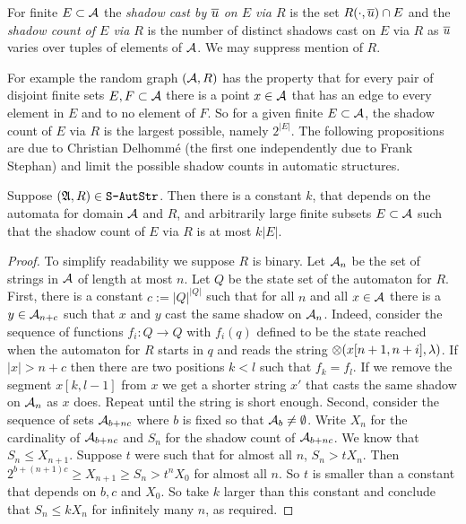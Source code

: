 \begin{definition}
For finite $E \subset {\mathcal A}$ the  {\em shadow cast by $\mbox{$\overline {u}$}$ on $E$ via $R$} is the set 
$R(\cdot,\mbox{$\overline {u}$}) \cap E$ and the {\em shadow count of $E$ via $R$} is the number of distinct shadows
cast on $E$ via $R$ as $\mbox{$\overline {u}$}$ varies over tuples of elements of ${\mathcal A}$. We may suppress mention of $R$.
\end{definition}

For example the random graph $({\mathcal A},R)$ has the property that for every pair of disjoint finite sets $E,F \subset {\mathcal A}$ there is a point $x \in {\mathcal A}$ that has an edge to every element in $E$ and to no element of $F$. So for a given finite $E \subset {\mathcal A}$, the shadow count of $E$ via $R$ is 
the largest possible, namely $2^{|E|}$. The following propositions are due to Christian Delhomm{\'e} \cite{Delh04} (the first one independently due to Frank Stephan) and limit the possible shadow counts in automatic structures.

\begin{proposition}
Suppose $(\mathfrak{A},R) \in \mbox{\tt S-AutStr}$.
Then there is a constant $k$,  that depends on the automata for domain ${{\mathcal A}}$ and $R$, and arbitrarily large finite subsets $E \subset {{\mathcal A}}$ such
that the shadow count of $E$ via $R$ is at most $k|E|$.
\end{proposition}

\begin{proof} To simplify readability we suppose $R$ is binary.
Let ${\mathcal A}_n$ be the set of strings in ${{\mathcal A}}$ of length at most $n$. Let $Q$ be the state set of the automaton for $R$. 
First,  there is a constant $c := |Q|^{|Q|}$ such that for all $n$ and all $x \in {{\mathcal A}}$ there is a 
$y \in {\mathcal A}_{n+c}$ such that $x$ and $y$ cast the same shadow on ${\mathcal A}_n$. Indeed, consider the sequence of functions $f_i:Q \to Q$
with $f_i(q)$ defined to be the state reached when the automaton for $R$ starts in $q$ and reads the
string $\otimes(x[n+1,n+i],\lambda)$.  If $|x| > n + c$ then there are two positions  $k < l$ such that $f_k = f_l$. If we remove the segment $x[k,l-1]$ from $x$ we
get a shorter string $x'$ that casts the same shadow on ${\mathcal A}_n$ as $x$ does. Repeat until the string is short enough.
Second, consider the sequence of sets
${\mathcal A}_{b+nc}$ where $b$ is fixed so that ${\mathcal A}_b \neq \emptyset$. Write $X_n$ for the cardinality of ${\mathcal A}_{b+nc}$ and $S_n$ for the shadow count of ${\mathcal A}_{b+nc}$. 
We know that $S_n \leq X_{n+1}$. Suppose $t$ were such that for almost all $n$, $S_n > t X_n$.  Then $2^{b+(n+1)c} \geq X_{n+1} \geq S_n > t^n X_0$ for almost all $n$. So  $t$ is smaller than a constant that depends on $b,c$ and $X_0$. So take $k$ larger than this constant and conclude that $S_n \leq k X_n$ for infinitely many $n$, as required.
\end{proof}

